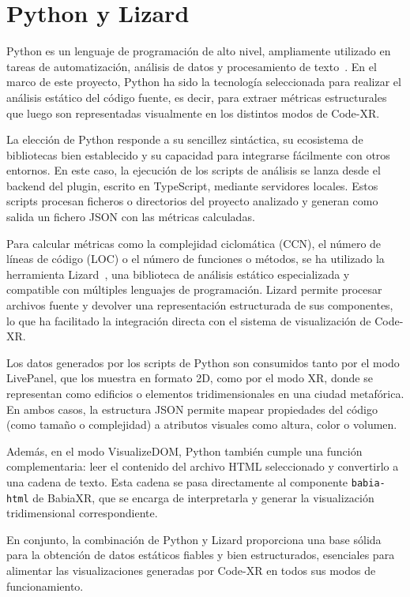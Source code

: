 \documentclass[a4paper, 12pt]{book}
\begin{document}
\section{Python y Lizard}
\label{sec:python-lizard}

Python es un lenguaje de programación de alto nivel, ampliamente utilizado en tareas de automatización, análisis de datos y procesamiento de texto~\cite{python}. En el marco de este proyecto, Python ha sido la tecnología seleccionada para realizar el análisis estático del código fuente, es decir, para extraer métricas estructurales que luego son representadas visualmente en los distintos modos de Code-XR.

La elección de Python responde a su sencillez sintáctica, su ecosistema de bibliotecas bien establecido y su capacidad para integrarse fácilmente con otros entornos. En este caso, la ejecución de los scripts de análisis se lanza desde el backend del plugin, escrito en TypeScript, mediante servidores locales. Estos scripts procesan ficheros o directorios del proyecto analizado y generan como salida un fichero JSON con las métricas calculadas.

Para calcular métricas como la complejidad ciclomática (CCN), el número de líneas de código (LOC) o el número de funciones o métodos, se ha utilizado la herramienta Lizard~\cite{lizard}, una biblioteca de análisis estático especializada y compatible con múltiples lenguajes de programación. Lizard permite procesar archivos fuente y devolver una representación estructurada de sus componentes, lo que ha facilitado la integración directa con el sistema de visualización de Code-XR.

Los datos generados por los scripts de Python son consumidos tanto por el modo LivePanel, que los muestra en formato 2D, como por el modo XR, donde se representan como edificios o elementos tridimensionales en una ciudad metafórica. En ambos casos, la estructura JSON permite mapear propiedades del código (como tamaño o complejidad) a atributos visuales como altura, color o volumen.

Además, en el modo VisualizeDOM, Python también cumple una función complementaria: leer el contenido del archivo HTML seleccionado y convertirlo a una cadena de texto. Esta cadena se pasa directamente al componente \texttt{babia-html} de BabiaXR, que se encarga de interpretarla y generar la visualización tridimensional correspondiente.

En conjunto, la combinación de Python y Lizard proporciona una base sólida para la obtención de datos estáticos fiables y bien estructurados, esenciales para alimentar las visualizaciones generadas por Code-XR en todos sus modos de funcionamiento.
\end{document}
